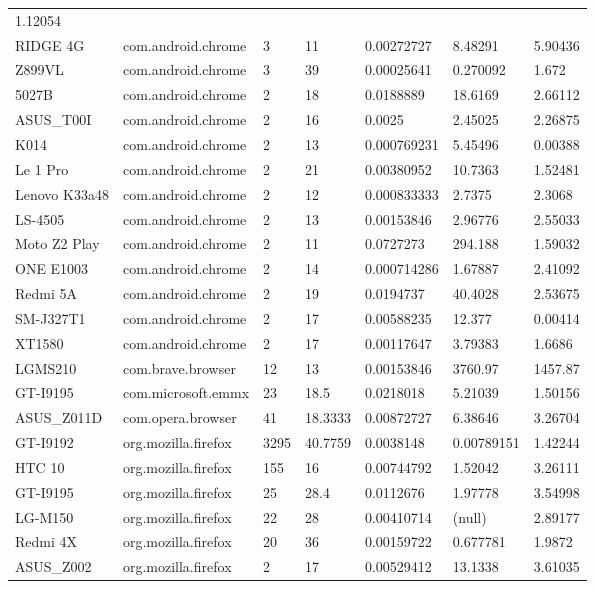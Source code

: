 \documentclass[
]{article}
\begin{document}
\begin{longtable}[]{@{}lllllll@{}}
1.12054\tabularnewline
RIDGE 4G & com.android.chrome & 3 & 11 & 0.00272727 & 8.48291 &
5.90436\tabularnewline
Z899VL & com.android.chrome & 3 & 39 & 0.00025641 & 0.270092 &
1.672\tabularnewline
5027B & com.android.chrome & 2 & 18 & 0.0188889 & 18.6169 &
2.66112\tabularnewline
ASUS\_T00I & com.android.chrome & 2 & 16 & 0.0025 & 2.45025 &
2.26875\tabularnewline
K014 & com.android.chrome & 2 & 13 & 0.000769231 & 5.45496 &
0.00388\tabularnewline
Le 1 Pro & com.android.chrome & 2 & 21 & 0.00380952 & 10.7363 &
1.52481\tabularnewline
Lenovo K33a48 & com.android.chrome & 2 & 12 & 0.000833333 & 2.7375 &
2.3068\tabularnewline
LS-4505 & com.android.chrome & 2 & 13 & 0.00153846 & 2.96776 &
2.55033\tabularnewline
Moto Z2 Play & com.android.chrome & 2 & 11 & 0.0727273 & 294.188 &
1.59032\tabularnewline
ONE E1003 & com.android.chrome & 2 & 14 & 0.000714286 & 1.67887 &
2.41092\tabularnewline
Redmi 5A & com.android.chrome & 2 & 19 & 0.0194737 & 40.4028 &
2.53675\tabularnewline
SM-J327T1 & com.android.chrome & 2 & 17 & 0.00588235 & 12.377 &
0.00414\tabularnewline
XT1580 & com.android.chrome & 2 & 17 & 0.00117647 & 3.79383 &
1.6686\tabularnewline
LGMS210 & com.brave.browser & 12 & 13 & 0.00153846 & 3760.97 &
1457.87\tabularnewline
GT-I9195 & com.microsoft.emmx & 23 & 18.5 & 0.0218018 & 5.21039 &
1.50156\tabularnewline
ASUS\_Z011D & com.opera.browser & 41 & 18.3333 & 0.00872727 & 6.38646 &
3.26704\tabularnewline
GT-I9192 & org.mozilla.firefox & 3295 & 40.7759 & 0.0038148 & 0.00789151
& 1.42244\tabularnewline
HTC 10 & org.mozilla.firefox & 155 & 16 & 0.00744792 & 1.52042 &
3.26111\tabularnewline
GT-I9195 & org.mozilla.firefox & 25 & 28.4 & 0.0112676 & 1.97778 &
3.54998\tabularnewline
LG-M150 & org.mozilla.firefox & 22 & 28 & 0.00410714 & (null) &
2.89177\tabularnewline
Redmi 4X & org.mozilla.firefox & 20 & 36 & 0.00159722 & 0.677781 &
1.9872\tabularnewline
ASUS\_Z002 & org.mozilla.firefox & 2 & 17 & 0.00529412 & 13.1338 &
3.61035\tabularnewline
\bottomrule
\end{longtable}
\end{document}
